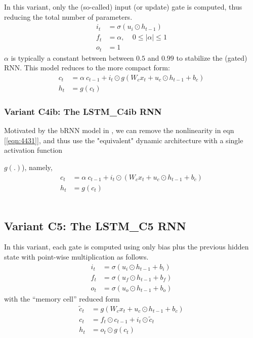 \documentclass{article}
\begin{document}
{{{In this variant, only the (so-called) input (or update) gate is computed, thus reducing the total number of parameters.
\begin{align}
	i_t &= \sigma(u_i \odot  h_{t-1} )\\
	f_t &= \alpha,  ~~~~~ 0 \leq  | \alpha | \leq  1 \\
	o_t &= 1
\end{align}
$\alpha$ is typically a constant between between $0.5$ and $0.99$ to stabilize the (gated) RNN.
This model reduces to the more compact form:
\begin{align}
	\label{eqn:CC31}	 c_t &=  \alpha ~ c_{t-1} + i_t \odot g(W_c x_t + u_c \odot  h_{t-1} + b_c)\\
	\label{eqn:CC41}	h_t &=  g(c_t)
\end{align}

\subsubsection{Variant C4ib: The LSTM\_C4ib RNN}

Motivated by the bRNN model in \cite {salem2016basic}, we can remove the nonlinearity in eqn [\ref{eqn:4431}], and thus use the "equivalent" dynamic architecture with a single activation function {$g(.)$), namely,
\begin{align}
	\label{eqn:CC431}	c_t &=  \alpha ~ c_{t-1} + i_t \odot (W_c x_t + u_c \odot  h_{t-1} + b_c)\\
	\label{eqn:CC441}	h_t &=  g(c_t)
\end{align}
\\

\subsection{Variant C5: The LSTM\_C5 RNN}
In this variant, each gate is computed using only bias plus the previous hidden state with point-wise multiplication as follows.
\begin{align}
	i_t &= \sigma(u_i \odot  h_{t-1} + b_i)\\
	f_t &= \sigma(u_f \odot h_{t-1} + b_f)\\
	o_t &= \sigma(u_o \odot  h_{t-1} + b_o)
\end{align}
with the ``memory cell'' reduced form
\begin{align}
	\label{eqn:C5C202}	\tilde{c}_t &= g(W_c x_t + u_c \odot  h_{t-1} + b_c)\\
	\label{eqn:C5C302}	 c_t &= f_t \odot c_{t-1} + i_t \odot \tilde{c}_t\\
	\label{eqn:C5C402}	h_t &= o_t \odot g(c_t)
\end{align}

}}}}
\end{document}
